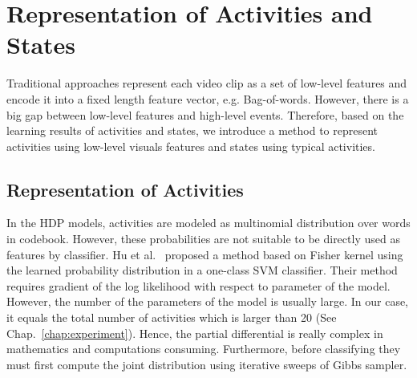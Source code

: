\section{Representation of Activities and States}
\label{framework:representation}

Traditional approaches represent each video clip as a set of low-level features and encode it into a fixed length feature vector, e.g. Bag-of-words. 
However, there is a big gap between low-level features and high-level events. 
Therefore, based on the learning results of activities and states, we introduce a method to represent activities using low-level visuals features and states using typical activities. 

\subsection*{Representation of Activities}
In the HDP models, activities are modeled as multinomial distribution over words in codebook. However, these probabilities are not suitable to be directly used as features by classifier. 
Hu et al.~\cite{hu2009abnormal} proposed a method based on Fisher kernel using the learned probability distribution in a one-class SVM classifier. 
Their method requires gradient of the log likelihood with respect to parameter of the model. 
However, the number of the parameters of the model is usually large. In our case, it equals the total number of activities which is larger than 20 (See Chap.~\ref{chap:experiment}). 
Hence, the partial differential is really complex in mathematics and computations consuming. 
Furthermore, before classifying they must first compute the joint distribution using iterative sweeps of Gibbs sampler.
